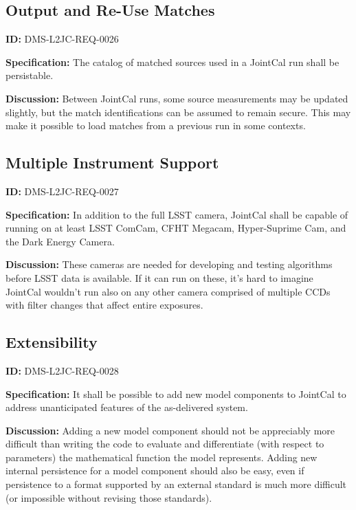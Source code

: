 \documentclass[SE,toc,lsstdraft]{lsstdoc}
\begin{document}
\subsection{Output and Re-Use Matches}

\label{DMS-L2JC-REQ-0026}
\textbf{ID:} DMS-L2JC-REQ-0026

\textbf{Specification:}
The catalog of matched sources used in a JointCal run shall be persistable.

\textbf{Discussion:}
Between JointCal runs, some source measurements may be updated slightly, but the match identifications can be assumed to remain secure.  This may make it possible to load matches from a previous run in some contexts.

\subsection{Multiple Instrument Support}

\label{DMS-L2JC-REQ-0027}
\textbf{ID:} DMS-L2JC-REQ-0027

\textbf{Specification:}
In addition to the full LSST camera, JointCal shall be capable of running on at least LSST ComCam, CFHT Megacam, Hyper-Suprime Cam, and the Dark Energy Camera.

\textbf{Discussion:}
These cameras are needed for developing and testing algorithms before LSST data is available.  If it can run on these, it's hard to imagine JointCal wouldn't run also on any other camera comprised of multiple CCDs with filter changes that affect entire exposures.

\subsection{Extensibility}

\label{DMS-L2JC-REQ-0028}
\textbf{ID:} DMS-L2JC-REQ-0028

\textbf{Specification:}
It shall be possible to add new model components to JointCal to address unanticipated features of the as-delivered system.

\textbf{Discussion:}
Adding a new model component should not be appreciably more difficult than writing the code to evaluate and differentiate (with respect to parameters) the mathematical function the model represents.  Adding new internal persistence for a model component should also be easy, even if persistence to a format supported by an external standard is much more difficult (or impossible without revising those standards).


\end{document}
